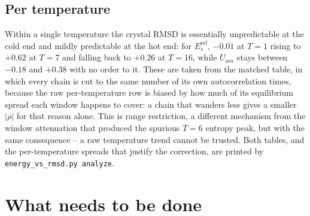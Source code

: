 \documentclass[11pt,a4paper]{article}
\begin{document}
\subsection{Per temperature}

Within a single temperature the crystal RMSD is essentially unpredictable at the cold end
and mildly predictable at the hot end: for $E_s^{\mathrm{ref}}$, $-0.01$ at $T=1$ rising to
$+0.62$ at $T=7$ and falling back to $+0.26$ at $T=16$, while $U_{am}$ stays between $-0.18$
and $+0.38$ with no order to it. These are
taken from the matched table, in which every chain is cut to the same number of its own
autocorrelation times, because the raw per-temperature row is biased by how much of its
equilibrium spread each window happens to cover: a chain that wanders less gives a smaller
$|\rho|$ for that reason alone. This is range restriction, a different mechanism from the
window attenuation that produced the spurious $T=6$ entropy peak, but with the same
consequence -- a raw temperature trend cannot be trusted. Both tables, and the
per-temperature spreads that justify the correction, are printed by
\texttt{energy\_vs\_rmsd.py analyze}.

\section{What needs to be done}
\end{document}
